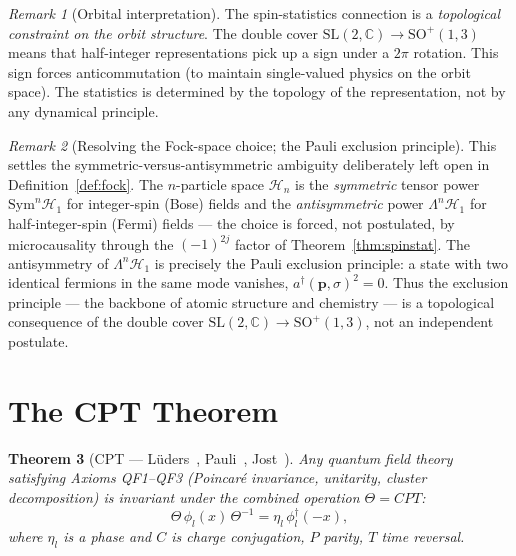 \documentclass[12pt]{article}
\theoremstyle{plain}
\newtheorem{theorem}{Theorem}[section]
\theoremstyle{definition}
\theoremstyle{remark}
\newtheorem{remark}[theorem]{Remark}
\newcommand{\SO}{\mathrm{SO}}
\newcommand{\SL}{\mathrm{SL}}
\begin{document}
\begin{remark}[Orbital interpretation]
The spin-statistics connection is a \emph{topological constraint on the orbit structure}. The double cover $\SL(2, \mathbb{C}) \to \SO^+(1,3)$ means that half-integer representations pick up a sign under a $2\pi$ rotation. This sign forces anticommutation (to maintain single-valued physics on the orbit space). The statistics is determined by the topology of the representation, not by any dynamical principle.
\end{remark}


\begin{remark}[Resolving the Fock-space choice; the Pauli exclusion principle]\label{rmk:fock-resolved}
This settles the symmetric-versus-antisymmetric ambiguity deliberately left open in
Definition~\ref{def:fock}. The $n$-particle space $\mathcal{H}_n$ is the \emph{symmetric} tensor power
$\mathrm{Sym}^n\mathcal{H}_1$ for integer-spin (Bose) fields and the \emph{antisymmetric} power
$\Lambda^n\mathcal{H}_1$ for half-integer-spin (Fermi) fields --- the choice is forced, not postulated, by
microcausality through the $(-1)^{2j}$ factor of Theorem~\ref{thm:spinstat}. The antisymmetry of
$\Lambda^n\mathcal{H}_1$ is precisely the Pauli exclusion principle: a state with two identical fermions in the
same mode vanishes, $a^\dagger(\mathbf{p},\sigma)^2=0$. Thus the exclusion principle --- the backbone of atomic
structure and chemistry --- is a topological consequence of the double cover
$\SL(2,\mathbb{C})\to\SO^+(1,3)$, not an independent postulate.
\end{remark}

\section{The CPT Theorem}
\label{sec:cpt}

\begin{theorem}[CPT --- L\"uders~\cite{luders1954}, Pauli~\cite{pauli1955}, Jost~\cite{jost1957}]\label{thm:cpt}
Any quantum field theory satisfying Axioms QF1--QF3 (Poincar\'e invariance, unitarity, cluster decomposition) is invariant under the combined operation $\Theta = CPT$:
\begin{equation}
\Theta\,\phi_l(x)\,\Theta^{-1} = \eta_l\,\phi_l^\dagger(-x),
\end{equation}
where $\eta_l$ is a phase and $C$ is charge conjugation, $P$ parity, $T$ time reversal.
\end{theorem}
\end{document}
